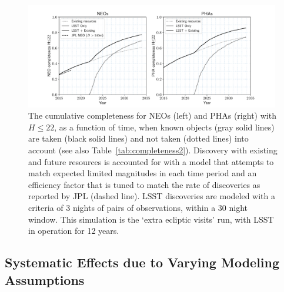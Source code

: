 \begin{figure}[t!]
\centering
\includegraphics[width=0.99\textwidth]{figures/astro_lsst_01_1016_completeness.pdf}
\vskip -0.2in
\caption{The cumulative completeness for NEOs (left) and PHAs (right) with $H\le22$, as a function of
time, when known objects (gray solid lines) are taken (black solid lines) and not taken (dotted lines)
into  account (see also Table~\ref{tab:completeness2}). Discovery with existing and future resources 
is accounted for with a model that attempts to match expected limited magnitudes in each time period
and an efficiency factor that is tuned to match the rate of discoveries as reported by JPL (dashed line). 
LSST discoveries are modeled with a criteria of 3 nights of pairs of observations, within a 30 night window. 
This simulation is the `extra ecliptic visits'  run, with LSST in operation for 12 years.
\label{fig:knownObj}}
\end{figure}



\subsection{Systematic Effects due to Varying Modeling Assumptions \label{sec:syseff}}

